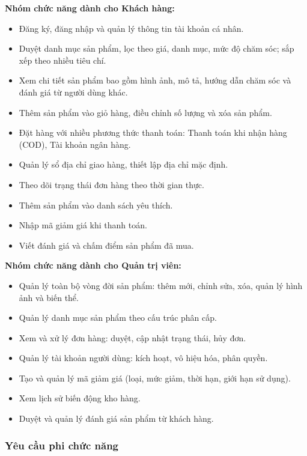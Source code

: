 \documentclass[11pt, a4paper]{article}
\begin{document}
\textbf{Nhóm chức năng dành cho Khách hàng:}
\begin{itemize}[leftmargin=*]
    \item Đăng ký, đăng nhập và quản lý thông tin tài khoản cá nhân.
    \item Duyệt danh mục sản phẩm, lọc theo giá, danh mục, mức độ chăm sóc; sắp xếp theo nhiều tiêu chí.
    \item Xem chi tiết sản phẩm bao gồm hình ảnh, mô tả, hướng dẫn chăm sóc và đánh giá từ người dùng khác.
    \item Thêm sản phẩm vào giỏ hàng, điều chỉnh số lượng và xóa sản phẩm.
    \item Đặt hàng với nhiều phương thức thanh toán: Thanh toán khi nhận hàng (COD), Tài khoản ngân hàng.
    \item Quản lý sổ địa chỉ giao hàng, thiết lập địa chỉ mặc định.
    \item Theo dõi trạng thái đơn hàng theo thời gian thực.
    \item Thêm sản phẩm vào danh sách yêu thích.
    \item Nhập mã giảm giá khi thanh toán.
    \item Viết đánh giá và chấm điểm sản phẩm đã mua.
\end{itemize}

\textbf{Nhóm chức năng dành cho Quản trị viên:}
\begin{itemize}[leftmargin=*]
    \item Quản lý toàn bộ vòng đời sản phẩm: thêm mới, chỉnh sửa, xóa, quản lý hình ảnh và biến thể.
    \item Quản lý danh mục sản phẩm theo cấu trúc phân cấp.
    \item Xem và xử lý đơn hàng: duyệt, cập nhật trạng thái, hủy đơn.
    \item Quản lý tài khoản người dùng: kích hoạt, vô hiệu hóa, phân quyền.
    \item Tạo và quản lý mã giảm giá (loại, mức giảm, thời hạn, giới hạn sử dụng).
    \item Xem lịch sử biến động kho hàng.
    \item Duyệt và quản lý đánh giá sản phẩm từ khách hàng.
\end{itemize}

\subsubsection{Yêu cầu phi chức năng}
\end{document}
